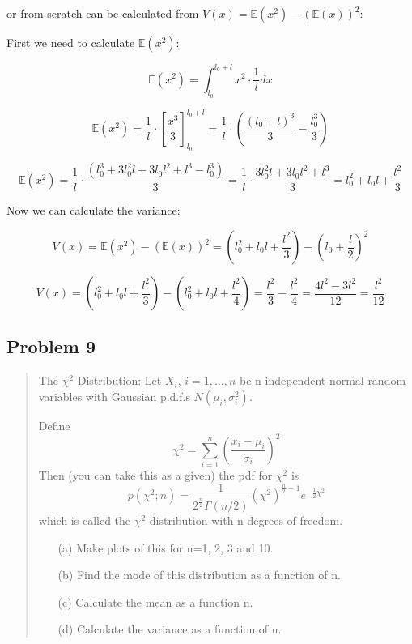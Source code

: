 \documentclass[10pt]{article}
\begin{document}
\begin{enumerate}[label=(\alph*)]
	      or from scratch can be calculated from $V(x) = \mathbb{E}(x^2) - (\mathbb{E}(x))^2$:

	      First we need to calculate $\mathbb{E}(x^2)$:

	      \[ \mathbb{E}(x^2) = \int_{l_0}^{l_0 + l} x^2 \cdot \frac{1}{l} dx \]

	      \[ \mathbb{E}(x^2) = \frac{1}{l} \cdot \left[ \frac{x^3}{3} \right]_{l_0}^{l_0 + l} = \frac{1}{l} \cdot \left( \frac{(l_0 + l)^3}{3} - \frac{l_0^3}{3} \right) \]

	      \[ \mathbb{E}(x^2) = \frac{1}{l} \cdot \frac{(l_0^3 + 3l_0^2 l + 3l_0 l^2 + l^3 - l_0^3)}{3} = \frac{1}{l} \cdot \frac{3l_0^2 l + 3l_0 l^2 + l^3}{3} = l_0^2 + l_0 l + \frac{l^2}{3} \]

	      Now we can calculate the variance:

	      \[ V(x) = \mathbb{E}(x^2) - (\mathbb{E}(x))^2 = (l_0^2 + l_0 l + \frac{l^2}{3}) - (l_0 + \frac{l}{2})^2 \]

	      \[ V(x) = (l_0^2 + l_0 l + \frac{l^2}{3}) - (l_0^2 + l_0 l + \frac{l^2}{4}) = \frac{l^2}{3} - \frac{l^2}{4} = \frac{4l^2 - 3l^2}{12} = \frac{l^2}{12} \]



\end{enumerate}

\subsection*{Problem 9}
\begin{quote}
	The $\chi^{2}$ Distribution: Let $X_{i}$, $i=1, ..., n$ be n independent normal random variables with Gaussian p.d.f.s $N(\mu_{i},\sigma_{i}^{2})$.

	Define
	$$ \chi^{2}=\sum_{i=1}^{n}\left(\frac{x_{i}-\mu_{i}}{\sigma_{i}}\right)^{2} $$
	Then (you can take this as a given) the pdf for $\chi^{2}$ is
	$$ p(\chi^{2};n)=\frac{1}{2^{\frac{n}{2}}\Gamma(n/2)}(\chi^{2})^{\frac{n}{2}-1}e^{-\frac{1}{2}\chi^{2}} $$
	which is called the $\chi^{2}$ distribution with n degrees of freedom.
	\begin{enumerate}
		\item[(a)] Make plots of this for n=1, 2, 3 and 10.
		\item[(b)] Find the mode of this distribution as a function of n.
		\item[(c)] Calculate the mean as a function n.
		\item[(d)] Calculate the variance as a function of n.
	\end{enumerate}
\end{quote}
\end{document}
